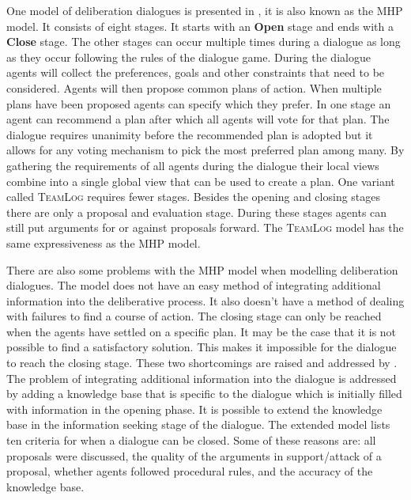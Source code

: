 One model of deliberation dialogues is presented in \cite{mcburney2007}, it is
also known as the MHP model. It
consists of eight stages. It starts with an \textbf{Open} stage and ends with
a \textbf{Close} stage. The other stages can occur multiple times during a
dialogue as long as they occur following the rules of the dialogue game.
During the dialogue agents will collect the preferences, goals and other
constraints that need to be considered. Agents will then propose common plans
of action. When multiple plans have been proposed agents can specify which they
prefer. In one stage an agent can recommend a plan after which all agents
will vote for that plan. The dialogue requires unanimity before the recommended
plan is adopted but it allows for any voting mechanism to pick the most
preferred plan among many. By gathering the requirements of all agents during
the dialogue their local views combine into a single global view that can be
used to create a plan. One variant called \textsc{TeamLog}
\cite{dunin-keplicz2011} requires fewer stages. Besides the opening and closing
stages there are only a proposal and evaluation stage. During these stages
agents can still put arguments for or against proposals forward. The
\textsc{TeamLog} model has the same expressiveness as the MHP model.

There are also some problems with the MHP model when modelling
deliberation dialogues. The model does not have an easy method of integrating
additional information into the deliberative process. It also doesn't have a
method of dealing with failures to find a course of action. The closing stage
can only be reached when the agents have settled on a specific plan. It may be
the case that it is not possible to find a satisfactory solution. This makes it
impossible for the dialogue to reach the closing stage. These two shortcomings
are raised and addressed by \cite{walton2014}. The problem of integrating
additional information into the dialogue is addressed by adding a knowledge
base that is specific to the dialogue which is initially filled with
information in the opening phase. It is possible to extend the knowledge base
in the information seeking stage of the dialogue. The extended model lists ten
criteria for when a dialogue can be closed. Some of these reasons are: all
proposals were discussed, the quality of the arguments in support/attack of a
proposal, whether agents followed procedural rules, and the accuracy of the
knowledge base.


